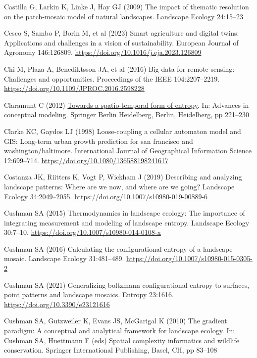 \documentclass[
  10pt,
  a4paperpaper,
]{article}
\newlength{\cslhangindent}
\newenvironment{CSLReferences}[2] %
 {\begin{list}{}{%
  \setlength{\itemindent}{0pt}
  \setlength{\leftmargin}{0pt}
  \setlength{\parsep}{0pt}
  \ifodd #1
   \setlength{\leftmargin}{\cslhangindent}
   \setlength{\itemindent}{-1\cslhangindent}
  \fi
  \setlength{\itemsep}{#2\baselineskip}}}
 {\end{list}}
\begin{document}
\begin{CSLReferences}{1}{1}
Castilla G, Larkin K, Linke J, Hay GJ (2009) The impact of thematic
resolution on the patch-mosaic model of natural landscapes. Landscape
Ecology 24:15--23

Cesco S, Sambo P, Borin M, et al (2023) Smart agriculture and digital
twins: Applications and challenges in a vision of sustainability.
European Journal of Agronomy 146:126809.
\url{https://doi.org/10.1016/j.eja.2023.126809}

Chi M, Plaza A, Benediktsson JA, et al (2016) Big data for remote
sensing: Challenges and opportunities. Proceedings of the IEEE
104:2207--2219. \url{https://doi.org/10.1109/JPROC.2016.2598228}

Claramunt C (2012)
\href{https://doi.org/10.1007/978-3-642-33999-8_28}{Towards a
spatio-temporal form of entropy}. In: Advances in conceptual modeling.
Springer Berlin Heidelberg, Berlin, Heidelberg, pp 221--230

Clarke KC, Gaydos LJ (1998) Loose-coupling a cellular automaton model
and GIS: Long-term urban growth prediction for san francisco and
washington/baltimore. International Journal of Geographical Information
Science 12:699--714. \url{https://doi.org/10.1080/136588198241617}

Costanza JK, Riitters K, Vogt P, Wickham J (2019) Describing and
analyzing landscape patterns: Where are we now, and where are we going?
Landscape Ecology 34:2049--2055.
\url{https://doi.org/10.1007/s10980-019-00889-6}

Cushman SA (2015) Thermodynamics in landscape ecology: The importance of
integrating measurement and modeling of landscape entropy. Landscape
Ecology 30:7--10. \url{https://doi.org/10.1007/s10980-014-0108-x}

Cushman SA (2016) Calculating the configurational entropy of a landscape
mosaic. Landscape Ecology 31:481--489.
\url{https://doi.org/10.1007/s10980-015-0305-2}

Cushman SA (2021) Generalizing boltzmann configurational entropy to
surfaces, point patterns and landscape mosaics. Entropy 23:1616.
\url{https://doi.org/10.3390/e23121616}

Cushman SA, Gutzweiler K, Evans JS, McGarigal K (2010) The gradient
paradigm: A conceptual and analytical framework for landscape ecology.
In: Cushman SA, Huettmann F (eds) Spatial complexity informatics and
wildlife conservation. Springer International Publishing, Basel, CH, pp
83--108


\end{CSLReferences}
\end{document}
